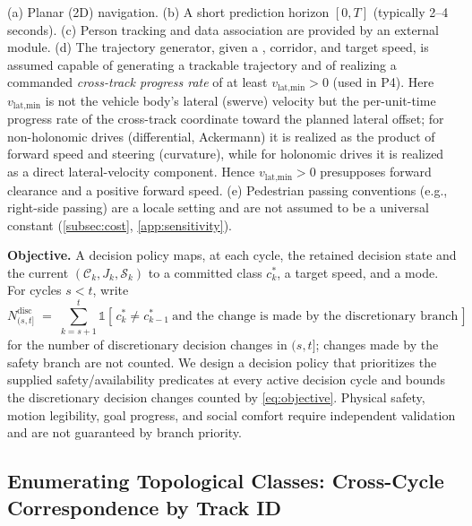 \begin{assumption}\label{asm:scope}
(a) Planar (2D) navigation. (b) A short prediction horizon $[0,T]$ (typically 2--4 seconds). (c) Person tracking and data association are provided by an external module. (d) The trajectory generator, given a \Class, corridor, and target speed, is assumed capable of generating a trackable trajectory and of realizing a commanded \emph{cross-track progress rate} of at least $v_{\text{lat,min}} > 0$ (used in P4). Here $v_{\text{lat,min}}$ is not the vehicle body's lateral (swerve) velocity but the per-unit-time progress rate of the cross-track coordinate toward the planned lateral offset; for non-holonomic drives (differential, Ackermann) it is realized as the product of forward speed and steering (curvature), while for holonomic drives it is realized as a direct lateral-velocity component. Hence $v_{\text{lat,min}} > 0$ presupposes forward clearance and a positive forward speed. (e) Pedestrian passing conventions (e.g., right-side passing) are a locale setting and are not assumed to be a universal constant (\cref{subsec:cost}, \cref{app:sensitivity}).
\end{assumption}

\noindent\textbf{Objective.} A decision policy maps, at each cycle, the retained decision state and the current $(\mathcal{C}_k, J_k, \mathcal{S}_k)$ to a committed class $c^*_k$, a target speed, and a mode. For cycles $s<t$, write
\begin{equation}
N^{\mathrm{disc}}_{(s,t]} \;=\; \sum_{k=s+1}^{t} \mathbb{1}\!\left[\,c^*_k \neq c^*_{k-1}\ \text{and the change is made by the discretionary branch}\,\right]
\label{eq:objective}
\end{equation}
for the number of discretionary decision changes in $(s,t]$; changes made by the safety branch are not counted. We design a decision policy that prioritizes the supplied safety/availability predicates at every active decision cycle and bounds the discretionary decision changes counted by \eqref{eq:objective}. Physical safety, motion legibility, goal progress, and social comfort require independent validation and are not guaranteed by branch priority.

\subsection{Enumerating Topological Classes: Cross-Cycle Correspondence by Track ID}\label{subsec:enum}

